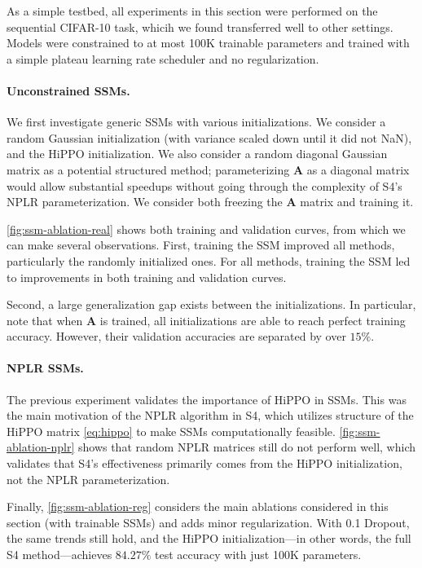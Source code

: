 As a simple testbed, all experiments in this section were performed on the sequential CIFAR-10 task, whicih we found transferred well to other settings. Models were constrained to at most 100K trainable parameters and trained with a simple plateau learning rate scheduler and no regularization.

\paragraph{Unconstrained SSMs.} We first investigate generic SSMs with various initializations. We consider a random Gaussian initialization (with variance scaled down until it did not NaN),  and the HiPPO initialization. We also consider a random diagonal Gaussian matrix as a potential structured method; parameterizing \( \bm{A} \) as a diagonal matrix would allow substantial speedups without going through the complexity of S4's NPLR parameterization. We consider both freezing the \( \bm{A} \) matrix and training it.

\ref{fig:ssm-ablation-real} shows both training and validation curves, from which we can make several observations. First, training the SSM improved all methods, particularly the randomly initialized ones. For all methods, training the SSM led to improvements in both training and validation curves.

Second, a large generalization gap exists between the initializations. In particular, note that when \( \bm{A} \) is trained, all initializations are able to reach perfect training accuracy. However, their validation accuracies are separated by over \( 15\% \).

\paragraph{NPLR SSMs.} The previous experiment validates the importance of HiPPO in SSMs. This was the main motivation of the NPLR algorithm in S4, which utilizes structure of the HiPPO matrix \eqref{eq:hippo} to make SSMs computationally feasible.
\ref{fig:ssm-ablation-nplr} shows that random NPLR matrices still do not perform well, which validates that S4's effectiveness primarily comes from the HiPPO initialization, not the NPLR parameterization.

Finally, \ref{fig:ssm-ablation-reg} considers the main ablations considered in this section (with trainable SSMs) and adds minor regularization. With 0.1 Dropout, the same trends still hold, and the HiPPO initialization---in other words, the full S4 method---achieves \( 84.27\% \) test accuracy with just 100K parameters.

